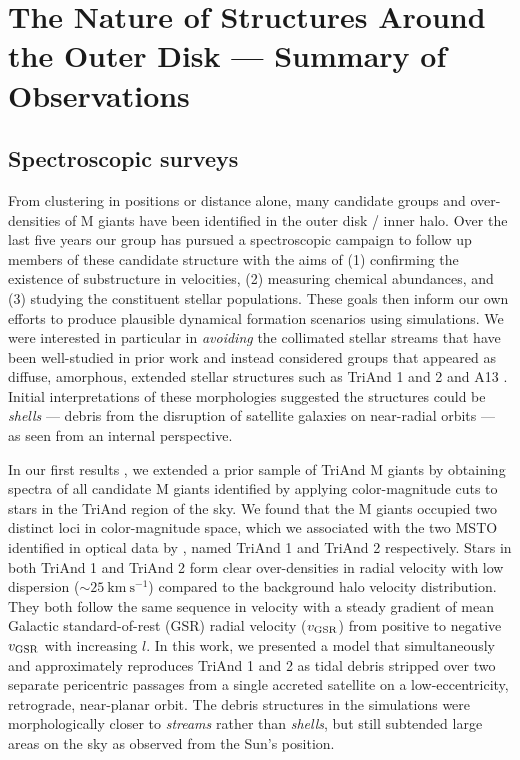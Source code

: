 \documentclass[galaxies,article,submit,moreauthors,pdftex,10pt,a4paper]{mdpi}
\newcommand{\kms}{\mathrm{km}~\mathrm{s}^{-1}}
\begin{document}
\section{The Nature of Structures Around the Outer Disk --- Summary of Observations}
\label{sec:obs}

\subsection{Spectroscopic surveys}

From clustering in positions or distance alone, many candidate groups and
over-densities of M giants have been identified in the outer disk / inner halo.
Over the last five years our group has pursued a spectroscopic campaign to
follow up members of these candidate structure with the aims of (1) confirming
the existence of substructure in velocities, (2) measuring chemical abundances,
and (3) studying the constituent stellar populations.
These goals then inform our own efforts to produce plausible dynamical
formation scenarios using simulations.
We were interested in particular in {\it avoiding} the collimated stellar streams that have been well-studied in prior work \cite[such as Sgr, Orphan, GD1 and Pal 5 --- see, e.g.,][]{law10,koposov10,kuepper15,bovy16}
and instead considered groups that appeared as diffuse, amorphous, extended stellar structures such as TriAnd 1 and 2 \cite{rochapinto04} and A13 \cite{sharma10}.
Initial interpretations of these morphologies suggested the structures could be {\it shells} --- debris from the disruption of satellite galaxies on near-radial orbits \cite{johnston08} --- as seen from an internal perspective.

In our first results \cite{sheffield14}, we extended a prior sample of TriAnd
M giants \cite{rochapinto04} by obtaining spectra of all candidate M giants identified by applying color-magnitude cuts to stars in the TriAnd region of the sky.
We found that the M giants occupied two distinct loci in color-magnitude space, which we associated with the two MSTO identified in optical data by \cite{martin07}, named TriAnd 1 and TriAnd 2 respectively.
Stars in both TriAnd 1 and TriAnd 2  form  clear over-densities in radial velocity with low dispersion ($\sim 25~\kms$) compared to the background halo velocity distribution.
They both follow the same  sequence in velocity with a steady gradient of mean Galactic standard-of-rest (GSR) radial velocity ($v_{\rm GSR}$) from positive to negative $v_{\rm GSR}$ with increasing $l$.
In this work, we presented a model that simultaneously and approximately reproduces TriAnd 1 and 2 as tidal debris stripped over two separate pericentric passages from a single accreted satellite on a low-eccentricity, retrograde, near-planar orbit.
The debris structures in the simulations were morphologically closer to {\it streams} rather
than {\it shells}, but still subtended large areas on the sky as observed from
the Sun's position.
\end{document}
